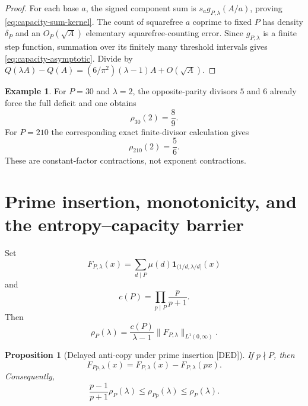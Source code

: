 \documentclass[11pt]{amsart}
\numberwithin{equation}{section}
\theoremstyle{plain}
\newtheorem{proposition}[theorem]{Proposition}
\theoremstyle{definition}
\newtheorem{example}[theorem]{Example}
\theoremstyle{remark}
\newcommand{\Mob}{\mu}
\newcommand{\Sq}{Q}
\newcommand{\DED}{\textup{[DED]}}
\begin{document}
\begin{proof}
For each base $a$, the signed component sum is $s_ag_{P,\lambda}(A/a)$, proving
\eqref{eq:capacity-sum-kernel}.  The count of squarefree $a$ coprime to fixed $P$ has density $\delta_P$ and an
$O_P(\sqrt A)$ elementary squarefree-counting error.  Since $g_{P,\lambda}$ is a finite step function, summation over
its finitely many threshold intervals gives \eqref{eq:capacity-asymptotic}.  Divide by
$\Sq(\lambda A)-\Sq(A)=(6/\pi^2)(\lambda-1)A+O(\sqrt A)$.
\end{proof}

\begin{example}
\label{ex:p30-capacity}
For $P=30$ and $\lambda=2$, the opposite-parity divisors $5$ and $6$ already force the full deficit and one obtains
\begin{equation}
\rho_{30}(2)=\frac89.
\label{eq:rho30}
\end{equation}
For $P=210$ the corresponding exact finite-divisor calculation gives
\begin{equation}
\rho_{210}(2)=\frac56.
\label{eq:rho210}
\end{equation}
These are constant-factor contractions, not exponent contractions.
\end{example}

\section{Prime insertion, monotonicity, and the entropy--capacity barrier}
\label{sec:capacity-monotonicity}

Set
\begin{equation}
F_{P,\lambda}(x)
=
\sum_{d\mid P}\Mob(d)\mathbf 1_{(1/d,\lambda/d]}(x)
\label{eq:reciprocal-kernel}
\end{equation}
and
\begin{equation}
c(P)=\prod_{p\mid P}\frac{p}{p+1}.
\label{eq:cP}
\end{equation}
Then
\begin{equation}
\rho_P(\lambda)
=
\frac{c(P)}{\lambda-1}\|F_{P,\lambda}\|_{L^1(0,\infty)}.
\label{eq:rho-L1}
\end{equation}

\begin{proposition}[Delayed anti-copy under prime insertion \DED]
\label{prop:prime-anti-copy}
If $p\nmid P$, then
\begin{equation}
F_{Pp,\lambda}(x)
=
F_{P,\lambda}(x)-F_{P,\lambda}(px).
\label{eq:prime-anti-copy}
\end{equation}
Consequently,
\begin{equation}
\frac{p-1}{p+1}\rho_P(\lambda)
\le
\rho_{Pp}(\lambda)
\le
\rho_P(\lambda).
\label{eq:rho-two-sided-step}
\end{equation}
\end{proposition}
\end{document}
